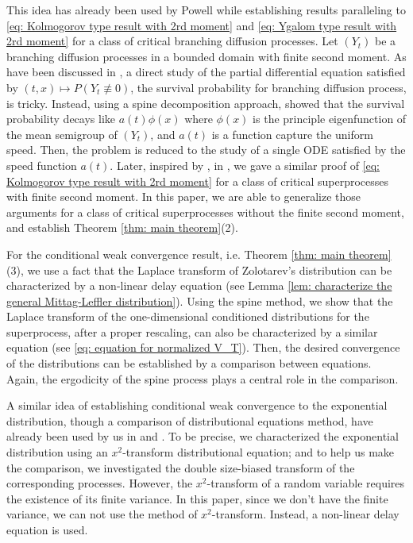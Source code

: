 \documentclass[12pt, a4paper]{amsart}
\theoremstyle{definition}
\numberwithin{equation}{section}
\begin{document}
	This idea has already been used by Powell \cite{Powell2015An-invariance} while establishing results paralleling to \eqref{eq: Kolmogorov type result with 2rd moment} and \eqref{eq: Ygalom type result with 2rd moment} for a class of critical branching diffusion processes.
	Let $(Y_t)$ be a branching diffusion processes in a bounded domain with finite second moment.
	As have been discussed in \cite{Powell2015An-invariance}, a direct study of the partial differential equation
	satisfied by $(t,x) \mapsto P(Y_t \not\equiv 0)$, the survival probability for branching diffusion process, is tricky.
	Instead, using a spine decomposition approach, \cite{Powell2015An-invariance} showed that the survival probability decays like $a(t)\phi(x)$ where $\phi(x)$ is the principle eigenfunction of the mean semigroup of $(Y_t)$, and $a(t)$ is a function capture the uniform speed.
	Then, the problem is reduced to the study of a single ODE satisfied by the speed function $a(t)$.
	Later, inspired by \cite{Powell2015An-invariance}, in \cite{RenSongSun2017Spine}, we gave a similar proof of \eqref{eq: Kolmogorov type result with 2rd moment} for a class of critical superprocesses with finite second moment.
	In this paper, we are able to generalize those arguments for a class of critical superprocesses without the finite second moment, and establish Theorem \ref{thm: main theorem}(2).
	
	For the conditional weak convergence result, i.e. Theorem \ref{thm: main theorem}(3), we use a fact that the Laplace transform of Zolotarev's distribution can be characterized by a non-linear delay equation (see Lemma \ref{lem: characterize the general Mittag-Leffler distribution}).
	Using the spine method, we show that the Laplace transform of the one-dimensional conditioned distributions for the superprocess, after a proper rescaling, can also be characterized by a similar equation (see \eqref{eq: equation for normalized V_T}).
	Then, the desired convergence of the distributions can be established by a comparison between equations.	
	Again, the ergodicity of the spine process plays a central role in the comparison.
	
	A similar idea of establishing conditional weak convergence to the exponential distribution, though a comparison of distributional equations method, have already been used by us in \cite{RenSongSun2017A-2-spine} and \cite{RenSongSun2017Spine}.
	To be precise, we characterized the exponential distribution using an $x^2$-transform distributional equation; and to help us make the comparison, we investigated the double size-biased transform of the corresponding processes.
	However, the $x^2$-transform of a random variable requires the existence of its finite variance.
	In this paper, since we don't have the finite variance, we can not use the method of $x^2$-transform.
	Instead, a non-linear delay equation is used.
	
\end{document}
